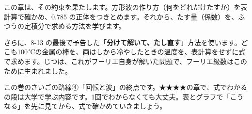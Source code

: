 この章は、その約束を果たします。方形波の作り方（何をどれだけたすか）を表計算で確かめ、0.785 の正体をつきとめます。それから、たす量（係数）を、ふつうの定積分で求める方法を学びます。

さらに、8-13 の最後で予告した「\textbf{分けて解いて、たし直す}」方法を使います。どこも100\,℃の金属の棒を、両はしから冷やしたときの温度を、表計算をせずに式で求めます。じつは、これがフーリエ自身が解いた問題で、フーリエ級数はこのために生まれました。

\begin{omoidasou}
\end{omoidasou}

この巻のさいごの路線④「回転と波」の終点です。★★★★の章で、式でわかるの段は大学で学ぶ内容です。1回でわからなくても大丈夫。表とグラフで「こうなる」を先に見てから、式で確かめていきましょう。

